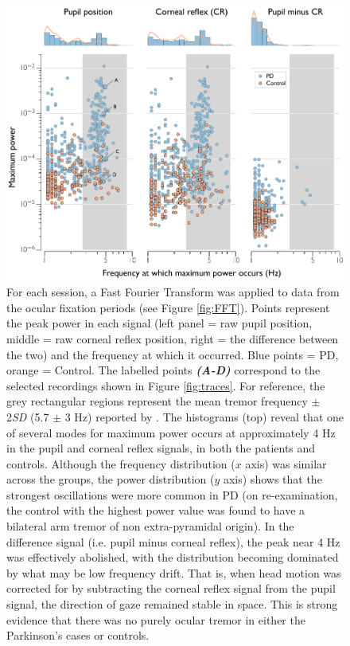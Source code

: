 \documentclass[jou,a4paper]{apa6}
\begin{document}
\begin{figure}[htbp]
\begin{center}
\includegraphics {Figures/Figure_4_Main_frequency_data}
\caption{For each session, a Fast Fourier Transform was applied to data from the ocular fixation periods (see Figure \ref{fig:FFT}). Points represent the peak power in each signal (left panel = raw pupil position, middle = raw corneal reflex position, right = the difference between the two) and the frequency at which it occurred. Blue points = PD, orange = Control. The labelled points \textbf{\textit{(A-D)}} correspond to the selected recordings shown in Figure \ref{fig:traces}. For reference, the grey rectangular regions represent the mean tremor frequency $\pm$ 2\textit{SD} (5.7 $\pm$ 3 Hz) reported by \cite{Gitchel2012Pervasive-ocula}. The histograms (top) reveal that one of several modes for maximum power occurs at approximately 4 Hz in the pupil and corneal reflex signals, in both the patients and controls. Although the frequency distribution ($x$ axis) was similar across the groups, the power distribution ($y$ axis) shows that the strongest oscillations were more common in PD (on re-examination, the control with the highest power value was found to have a bilateral arm tremor of non extra-pyramidal origin). In the difference signal (i.e. pupil minus corneal reflex), the peak near 4 Hz was effectively abolished, with the distribution becoming dominated by what may be low frequency drift. That is, when head motion was corrected for by subtracting the corneal reflex signal from the pupil signal, the direction of gaze remained stable in space. This is strong evidence that there was no purely ocular tremor in either the Parkinson's cases or controls.}
\label{fig:main}
\end{center}
\end{figure}
\end{document}
